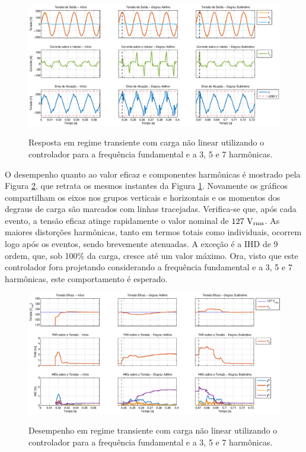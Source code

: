 \documentclass[repeatfields,oneside]{tcc}
\begin{document}
\begin{figure}[!h]
    \centering
    \caption{Resposta em regime transiente com carga não linear utilizando o controlador para a frequência fundamental e a 3{\textordfeminine}, 5{\textordfeminine} e 7{\textordfeminine} harmônicas.}
    \includegraphics[trim={80 20 1 20}, clip, width=\linewidth]{fig/closed_7.eps}
    \\
    \label{fig:closed_7}
\end{figure}

\newpage
O desempenho quanto ao valor eficaz e componentes harmônicas é mostrado pela Figura \ref{fig:harm_7}, que retrata os mesmos instantes da Figura \ref{fig:closed_7}.
Novamente os gráficos compartilham os eixos nos grupos verticais e horizontais e os momentos dos degraus de carga são marcados com linhas tracejadas.
Verifica-se que, após cada evento, a tensão eficaz atinge rapidamente o valor nominal de $127 \text{ V\textsubscript{rms}}$.
As maiores distorções harmônicas, tanto em termos totais como individuais, ocorrem logo após os eventos, sendo brevemente atenuadas.
A exceção é a IHD de 9{\textordfeminine} ordem, que, sob 100\% da carga, cresce até um valor máximo.
Ora, visto que este controlador fora projetando considerando a frequência fundamental e a 3{\textordfeminine}, 5{\textordfeminine} e 7{\textordfeminine} harmônicas, este comportamento é esperado.

\begin{figure}[h]
    \centering
    \caption{Desempenho em regime transiente com carga não linear utilizando o controlador para a frequência fundamental e a 3{\textordfeminine}, 5{\textordfeminine} e 7{\textordfeminine} harmônicas.}
    \includegraphics[trim={80 20 1 20}, clip, width=\linewidth]{fig/harm_7.eps}
    \\
    \label{fig:harm_7}
\end{figure}
\end{document}
